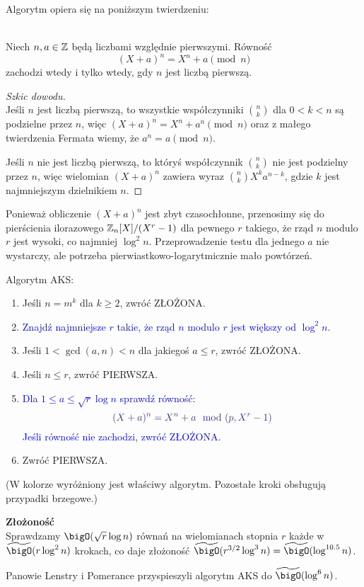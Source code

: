 Algorytm opiera się na poniższym twierdzeniu:

\begin{theorem} \\
Niech \( n, a \in \mathbb{Z} \) będą liczbami względnie pierwszymi. Równość
\[
    (X + a)^n = X^n + a \pmod{n}
\]
zachodzi wtedy i tylko wtedy, gdy \( n \) jest liczbą pierwszą.
\end{theorem}
\begin{proof}[Szkic dowodu]\\
Jeśli \( n \) jest liczbą pierwszą, to wszystkie współczynniki \( n \choose k \) dla \( 0 < k < n \) są podzielne przez \( n \), więc \( (X + a)^n = X^n + a^n \pmod{n} \) oraz z małego twierdzenia Fermata wiemy, że \( a^n = a \pmod{n} \).

Jeśli \( n \) nie jest liczbą pierwszą, to któryś współczynnik \( n \choose k \) nie jest podzielny przez \( n \), więc wielomian \( (X + a)^n \) zawiera wyraz \( {n \choose k} X^ka^{n-k} \), gdzie \( k \) jest najmniejszym dzielnikiem \( n \).
\end{proof}

Ponieważ obliczenie \( (X + a)^n \) jest zbyt czasochłonne, przenosimy się do pierścienia ilorazowego \( \mathbb{Z}_n[X]/(X^r - 1) \) dla pewnego \( r \) takiego, że rząd \( n \)
modulo \( r \) jest wysoki, co najmniej \( \log^2n \). Przeprowadzenie testu dla jednego \( a \) nie wystarczy, ale potrzeba pierwiastkowo-logarytmicznie mało powtórzeń.

\newpage
\begin{greyframe}
    Algorytm AKS:
    \begin{enumerate}
        \item Jeśli \( n = m^k \) dla \( k \geq 2 \), zwróć ZŁOŻONA.
        \item \textcolor{Blue}{Znajdź najmniejsze \( r \) takie, że rząd \( n \) modulo \( r \) jest większy od \( \log^2n \).}
        \item Jeśli \( 1 < \gcd(a, n) < n \) dla jakiegoś \( a \leq r \), zwróć ZŁOŻONA.
        \item Jeśli \( n \leq r \), zwróć PIERWSZA.
        \item \textcolor{Blue}{Dla \( 1 \leq a \leq \sqrt{r}\log n \) sprawdź równość:}
        \[
            \textcolor{Blue}{(X + a)^n = X^n + a \mod (p, X^r-1)}
        \]
        \textcolor{Blue}{Jeśli równość nie zachodzi, zwróć ZŁOŻONA.}
        \item Zwróć PIERWSZA.
    \end{enumerate}
\end{greyframe}
{\small (W kolorze wyróżniony jest właściwy algorytm. Pozostałe kroki obsługują przypadki brzegowe.)}

\textbf{Złożoność} \\
Sprawdzamy \( \bigO(\sqrt{r} \log n) \) równań na wielomianach stopnia \( r \) każde w \( \widetilde{\bigO}(r \log^2n) \) krokach, co daje złożoność \( \widetilde{\bigO}(r^{3/2} \log^3n) = \widetilde{\bigO}(\log^{10.5}n)\).

Panowie Lenstry i Pomerance przyspieszyli algorytm AKS do \( \widetilde{\bigO}(\log^6n) \).
